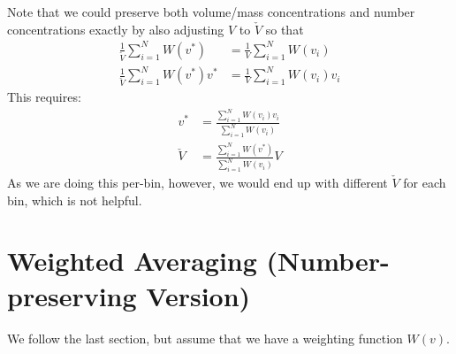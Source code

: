 \documentclass{article}
\begin{document}
Note that we could preserve both volume/mass concentrations and number
concentrations exactly by also adjusting $V$ to $\check{V}$ so that
\begin{align*}
  \frac{1}{\check{V}} \sum_{i=1}^N W(v^*) &= \frac{1}{V} \sum_{i=1}^N W(v_i) \\
  \frac{1}{\check{V}} \sum_{i=1}^N W(v^*) v^* &= \frac{1}{V} \sum_{i=1}^N W(v_i) v_i
\end{align*}
This requires:
\begin{align*}
  v^* &= \frac{\sum_{i=1}^N W(v_i) v_i}{\sum_{i=1}^N W(v_i)} \\
  \check{V} &= \frac{\sum_{i=1}^N W(v^*)}{\sum_{i=1}^N W(v_i)} V
\end{align*}
As we are doing this per-bin, however, we would end up with different
$\check{V}$ for each bin, which is not helpful.

\newpage

\section{Weighted Averaging (Number-preserving Version)}

We follow the last section, but assume that we have a weighting
function $W(v)$.
\end{document}
